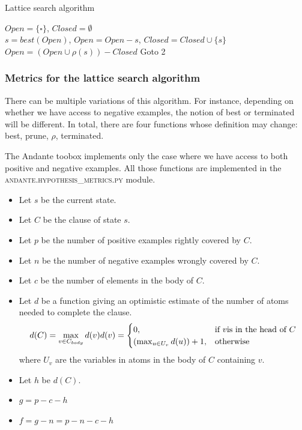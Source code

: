 \documentclass{article}
\begin{document}
\begin{algorithm}[H]
\label{algo:latticeSearch}
\caption{Lattice search algorithm}
$Open = \{\square\}$, $Closed = \emptyset$ \\
$s = best(Open)$, $Open = Open - s$, $Closed = Closed \cup \{s\}$  
$Open = (Open \cup \rho(s)) - Closed$ 
Goto 2
\end{algorithm}

\subsubsection{Metrics for the lattice search algorithm} \label{ilp:inductionalgo:metrics}

There can be multiple variations of this algorithm. For instance, depending on
whether we have access to negative examples, the notion of best or terminated
will be different.
In total, there are four functions whose definition may change: best, prune,
$\rho$, terminated.

The Andante toobox implements only the case where we have access to both
positive and negative examples. All those functions are implemented in the
\textsc{andante.hypothesis\_metrics.py} module.

\begin{itemize}
    \item Let $s$ be the current state. 
    \item Let $C$ be the clause of state $s$.
    \item Let $p$ be the number of positive examples rightly covered by $C$.
    \item Let $n$ be the number of negative examples wrongly covered by $C$.
    \item Let $c$ be the number of elements in the body of $C$.
    \item Let $d$ be a function giving an optimistic estimate of the number of
        atoms needed to complete the clause.
            \[
                d(C) = \max_{v \in C_{body}} d(v) \\
                d(v) = 
            \begin{cases}
                0, & \text{if } v \text{is in the head of }C\\
                (\max_{u\in U_v} d(u)) +1,              & \text{otherwise}
            \end{cases}
            \] where $U_v$ are the variables in atoms in the body of $C$ containing $v$.
    \item Let $h$ be $d(C)$.
    \item $g = p-c-h$
    \item $f = g-n = p-n-c-h$
\end{itemize}
\end{document}
